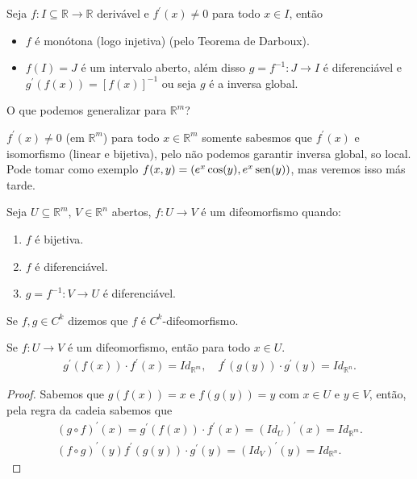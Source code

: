 \begin{theorem}
  Seja $f:I\subseteq \mathbb{R}\to\mathbb{R}$ derivável e $f^{\prime}(x)\neq 0$ para todo $x\in I$, então
  \begin{itemize}
    \item $f$ é monótona (logo injetiva) (pelo Teorema de Darboux). 
    \item $f(I)=J$ é um intervalo aberto, além disso $g=f^{-1}:J\to I$ é diferenciável e $g^{\prime}(f(x))=\left[ f(x) \right]^{-1}$ ou seja $g$ é a inversa global. 
  \end{itemize}
\end{theorem}
O que podemos generalizar para $\mathbb{R}^{m}$?

$f^{\prime}(x)\neq 0$ (em $\mathbb{R}^{m}$) para todo $x\in\mathbb{R}^{m}$ somente sabesmos que $f^{\prime}(x)$ e isomorfismo (linear e bijetiva), pelo não podemos garantir inversa global, so local.\\
Pode tomar como exemplo $f(x,y)=(e^{x}\cos(y),e^{x}\operatorname{sen}(y))$, mas veremos isso más tarde.
\begin{definition}[Difeomorfismo]
  Seja $U\subseteq \mathbb{R}^{m}$, $V\in\mathbb{R}^{n}$ abertos, $f:U\to V$ é um difeomorfismo quando:
  \begin{enumerate}
    \item $f$ é bijetiva.
    \item $f$ é diferenciável.
    \item $g=f^{-1}:V\to U$ é diferenciável. 
  \end{enumerate}
  Se $f,g\in C^{k}$  dizemos que $f$ é $C^{k}$-difeomorfismo. 
\end{definition}
\begin{proposition}\label{prop:difeo-identidade}
  Se $f:U\to V$ é um difeomorfismo, então para todo $x\in U$.
  \begin{align*}
    g^{\prime}(f(x))\cdot f^{\prime}(x)=Id_{\mathbb{R}^{m}},\quad f^{\prime}(g(y))\cdot g^{\prime}(y)=Id_{\mathbb{R}^{n}}.
  \end{align*}
\end{proposition}
\begin{proof} 
  Sabemos que $g(f(x))=x$ e $f(g(y))=y$ com $x\in U$ e $y\in V$, então, pela regra da cadeia sabemos que
  \begin{align*}
    \left( g\circ f \right)^{\prime}(x)=g^{\prime}(f(x))\cdot f^{\prime}(x)=\left( Id_{U} \right)^{\prime}(x)=Id_{\mathbb{R}^{m}}.\\
    \left( f\circ g \right)^{\prime}(y)f^{\prime}(g(y))\cdot g^{\prime}(y)=\left( Id_{V} \right)^{\prime}(y)=Id_{\mathbb{R}^{n}}.
  \end{align*}
\end{proof}
